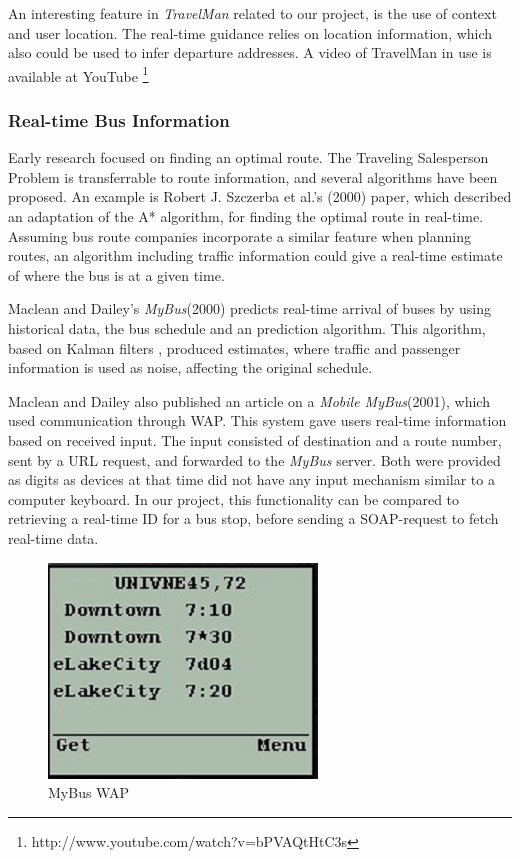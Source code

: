 An interesting feature in \emph{TravelMan} related to our project, is the use of context and user location. The real-time guidance relies on location information, which also could be used to infer departure addresses. 
A video of TravelMan in use is available at YouTube \footnote{http://www.youtube.com/watch?v=bPVAQtHtC3s}

\subsubsection{Real-time Bus Information}
Early research focused on finding an optimal route. The Traveling Salesperson Problem \cite{tsp} is transferrable to route information, and several algorithms have been proposed. An example is Robert J. Szczerba et al.'s (2000) paper, which described an adaptation of the A*\cite{astar} algorithm, for finding the optimal route in real-time\cite{szc}. Assuming bus route companies incorporate a similar feature when planning routes, an algorithm including traffic information could give a real-time estimate of where the bus is at a given time. 

Maclean and Dailey's \emph{MyBus}(2000) predicts real-time arrival of buses by using historical data, the bus schedule and an prediction algorithm\cite{mybus}. This algorithm, based on Kalman filters \cite{kalman}, produced estimates, where traffic and passenger information is used as noise, affecting the original schedule.

Maclean and Dailey also published an article on a \emph{Mobile MyBus}(2001), which used communication through WAP\cite{maclean}. This system gave users real-time information based on received input. The input consisted of destination and a route number, sent by a URL request, and forwarded to the \emph{MyBus} server. Both were provided as digits as devices at that time did not have any input mechanism similar to a computer keyboard. In our project, this functionality can be compared to retrieving a real-time ID for a bus stop, before sending a SOAP-request to fetch real-time data. 

\begin{figure}
  \begin{center}
    \includegraphics[scale=0.8]{ExistingSolutions/mybus.jpg}
  \end{center}
  \caption{MyBus WAP}
\end{figure}

